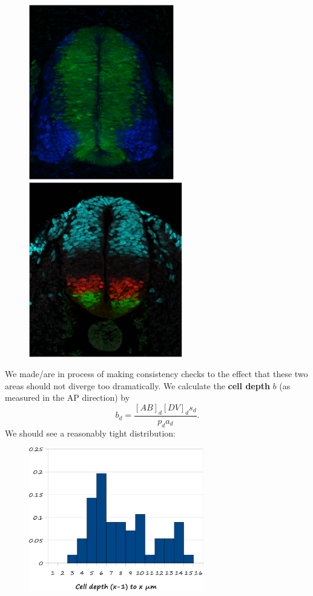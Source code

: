 \documentclass[10pt,english]{report}
\begin{document}
\begin{figure}[h]
	\begin{center}
		\includegraphics[height=3in]{transverse-stained-sox2-p27.pdf}\includegraphics[height=3in]{transverse-stained-domains.pdf}
	\end{center}
\end{figure}

We made/are in process of making consistency checks to the effect that these two areas should not diverge too dramatically. We calculate the \textbf{cell depth} $b$ (as measured in the AP direction) by $$b_d = \frac{[AB]_d[DV]_d s_d}{p_d a_d}.$$ We should see a reasonably tight distribution:

\begin{figure}[h]
	\begin{center}
		\includegraphics[width=3in]{consistency-cell-depth-distribution.png}
	\end{center}
\end{figure}
\end{document}

